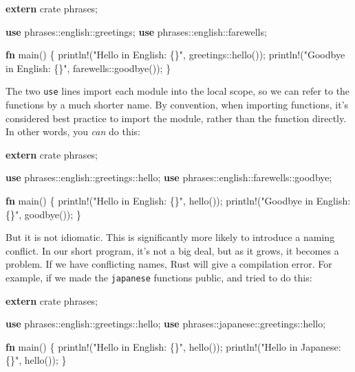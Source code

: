 \documentclass[a4paper,]{book}
\newenvironment{Shaded}{\begin{snugshade}}{\end{snugshade}}
\newcommand{\KeywordTok}[1]{\textcolor[rgb]{0.13,0.29,0.53}{\textbf{{#1}}}}
\newcommand{\StringTok}[1]{\textcolor[rgb]{0.31,0.60,0.02}{{#1}}}
\newcommand{\OtherTok}[1]{\textcolor[rgb]{0.56,0.35,0.01}{{#1}}}
\newcommand{\NormalTok}[1]{{#1}}
\begin{document}
\begin{Shaded}
\begin{Highlighting}[]
\KeywordTok{extern} \NormalTok{crate phrases;}

\KeywordTok{use} \NormalTok{phrases::english::greetings;}
\KeywordTok{use} \NormalTok{phrases::english::farewells;}

\KeywordTok{fn} \NormalTok{main() \{}
    \OtherTok{println!}\NormalTok{(}\StringTok{"Hello in English: \{\}"}\NormalTok{, greetings::hello());}
    \OtherTok{println!}\NormalTok{(}\StringTok{"Goodbye in English: \{\}"}\NormalTok{, farewells::goodbye());}
\NormalTok{\}}
\end{Highlighting}
\end{Shaded}

The two \texttt{use} lines import each module into the local scope, so
we can refer to the functions by a much shorter name. By convention,
when importing functions, it's considered best practice to import the
module, rather than the function directly. In other words, you
\emph{can} do this:

\begin{Shaded}
\begin{Highlighting}[]
\KeywordTok{extern} \NormalTok{crate phrases;}

\KeywordTok{use} \NormalTok{phrases::english::greetings::hello;}
\KeywordTok{use} \NormalTok{phrases::english::farewells::goodbye;}

\KeywordTok{fn} \NormalTok{main() \{}
    \OtherTok{println!}\NormalTok{(}\StringTok{"Hello in English: \{\}"}\NormalTok{, hello());}
    \OtherTok{println!}\NormalTok{(}\StringTok{"Goodbye in English: \{\}"}\NormalTok{, goodbye());}
\NormalTok{\}}
\end{Highlighting}
\end{Shaded}

But it is not idiomatic. This is significantly more likely to introduce
a naming conflict. In our short program, it's not a big deal, but as it
grows, it becomes a problem. If we have conflicting names, Rust will
give a compilation error. For example, if we made the \texttt{japanese}
functions public, and tried to do this:

\begin{Shaded}
\begin{Highlighting}[]
\KeywordTok{extern} \NormalTok{crate phrases;}

\KeywordTok{use} \NormalTok{phrases::english::greetings::hello;}
\KeywordTok{use} \NormalTok{phrases::japanese::greetings::hello;}

\KeywordTok{fn} \NormalTok{main() \{}
    \OtherTok{println!}\NormalTok{(}\StringTok{"Hello in English: \{\}"}\NormalTok{, hello());}
    \OtherTok{println!}\NormalTok{(}\StringTok{"Hello in Japanese: \{\}"}\NormalTok{, hello());}
\NormalTok{\}}
\end{Highlighting}
\end{Shaded}
\end{document}
